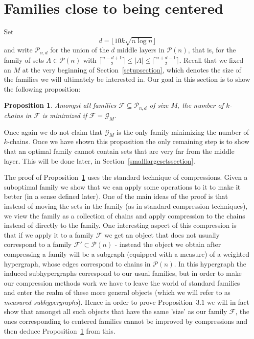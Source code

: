 \documentclass[12pt]{article}
\newtheorem{prop}[theorem]{Proposition}
\numberwithin{equation}{section}
\def\F{\mathcal{F}}
\def\G{\mathcal{G}}
\def\P{\mathcal{P}}
\begin{document}
\section{Families close to being centered}

Set $$d=\lfloor 10k\sqrt{n\log n}\rfloor$$ and write $\P_{n,d}$ for the union of the $d$ middle layers in $\P(n)$, that is, for the family of sets $A\in \P(n)$ with $\lceil\frac{n-d+1}{2}\rceil\leq |A|\leq \lceil\frac{n+d-1}{2}\rceil$. Recall that we fixed an $M$ at the very beginning of Section~\ref{setupsection}, which denotes the size of the families we will ultimately be interested in. Our goal in this section is to show the following proposition:
\begin{prop}\label{mainmiddle}
Amongst all families $\F\subseteq \P_{n,d}$ of size $M$, the number of $k$-chains in $\F$ is minimized if $\F=\G_M$. 
\end{prop}
Once again we do not claim that $\G_M$ is the only family minimizing the number of $k$-chains. Once we have shown this proposition the only remaining step is to show that an optimal family cannot contain sets that are very far from the middle layer. This will be done later, in Section~\ref{smalllargesetssection}.

The proof of Proposition~\ref{mainmiddle} uses the standard technique of compressions. Given a suboptimal family we show that we can apply some operations to it to make it better (in a sense defined later). One of the main ideas of the proof is that instead of moving the sets in the family (as in standard compression techniques), we view the family as a collection of chains and apply compression to the chains instead of directly to the family. One interesting aspect of this compression is that if we apply it to a family $\F$ we get an object that does not usually correspond to a family $\F'\subset \P(n)$ - instead the object we obtain after compressing a family will be a subgraph (equipped with a measure) of a weighted hypergraph, whose edges correspond to chains in $\P(n)$. In this hypergraph the induced subhypergraphs correspond to our usual families, but in order to make our compression methods work we have to leave the world of standard families and enter the realm of these more general objects (which we will refer to as \emph{measured subhypergraphs}). Hence in order to prove Proposition~$3.1$ we will in fact show that amongst all such objects that have the same 'size' as our family $\F$, the ones corresponding to centered families cannot be improved by compressions and then deduce Proposition~\ref{mainmiddle} from this.
\end{document}
